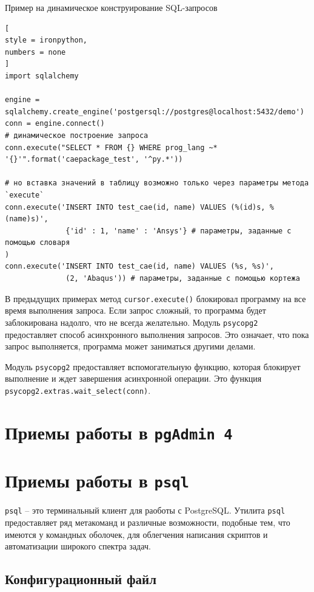 \documentclass[%
	11pt,
	a4paper,
	utf8,
		]{article}
\begin{document}
Пример на динамическое конструирование SQL-запросов
\begin{lstlisting}[
style = ironpython,
numbers = none
]
import sqlalchemy

engine = sqlalchemy.create_engine('postgersql://postgres@localhost:5432/demo')
conn = engine.connect()
# динамическое построение запроса
conn.execute("SELECT * FROM {} WHERE prog_lang ~* '{}'".format('caepackage_test', '^py.*'))

# но вставка значений в таблицу возможно только через параметры метода `execute`
conn.execute('INSERT INTO test_cae(id, name) VALUES (%(id)s, %(name)s)',
              {'id' : 1, 'name' : 'Ansys'} # параметры, заданные с помощью словаря
)
conn.execute('INSERT INTO test_cae(id, name) VALUES (%s, %s)',
              (2, 'Abaqus')) # параметры, заданные с помощью кортежа
\end{lstlisting}

В предыдущих примерах метод \verb|cursor.execute()| блокировал программу на все время выполнения запроса. Если запрос сложный, то программа будет заблокирована надолго, что не всегда желательно. Модуль \texttt{psycopg2} предоставляет способ асинхронного выполнения запросов. Это означает, что пока запрос выполняется, программа может заниматься другими делами.

Модуль \texttt{psycopg2} предоставляет вспомогательную функцию, которая блокирует выполнение и ждет завершения асинхронной операции. Это функция \texttt{psycopg2.extras.wait\_select(conn)}.


\section{Приемы работы в \texttt{pgAdmin 4}}

\section{Приемы работы в \texttt{psql}}

\texttt{psql} -- это терминальный клиент для раоботы с PostgreSQL. Утилита \texttt{psql} предоставляет ряд метакоманд и различные возможности, подобные тем, что имеются у командных оболочек, для облегчения написания скриптов и автоматизации широкого спектра задач.

\subsection{Конфигурационный файл}
\end{document}
